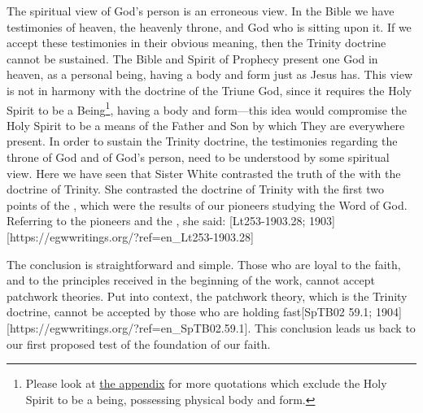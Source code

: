 The spiritual view of God’s person is an erroneous view. In the Bible we have testimonies of heaven, the heavenly throne, and God who is sitting upon it. If we accept these testimonies in their obvious meaning, then the Trinity doctrine cannot be sustained. The Bible and Spirit of Prophecy present one God in heaven, as a personal being, having a body and form just as Jesus has. This view is not in harmony with the doctrine of the Triune God, since it requires the Holy Spirit to be a Being\footnote{Please look at \hyperref[appendix:unauthenticated-reports]{the appendix} for more quotations which exclude the Holy Spirit to be a being, possessing physical body and form.}, having a body and form—this idea would compromise the Holy Spirit to be a means of the Father and Son by which They are everywhere present. In order to sustain the Trinity doctrine, the testimonies regarding the throne of God and of God’s person, need to be understood by some spiritual view. Here we have seen that Sister White contrasted the truth of the  with the doctrine of Trinity. She contrasted the doctrine of Trinity with the first two points of the , which were the results of our pioneers studying the Word of God. Referring to the pioneers and the , she said: [Lt253-1903.28; 1903][https://egwwritings.org/?ref=en\_Lt253-1903.28]

The conclusion is straightforward and simple. Those who are loyal to the faith, and to the principles received in the beginning of the work, cannot accept patchwork theories. Put into context, the patchwork theory, which is the Trinity doctrine, cannot be accepted by those who are holding fast[SpTB02 59.1; 1904][https://egwwritings.org/?ref=en\_SpTB02.59.1]. This conclusion leads us back to our first proposed test of the foundation of our faith.